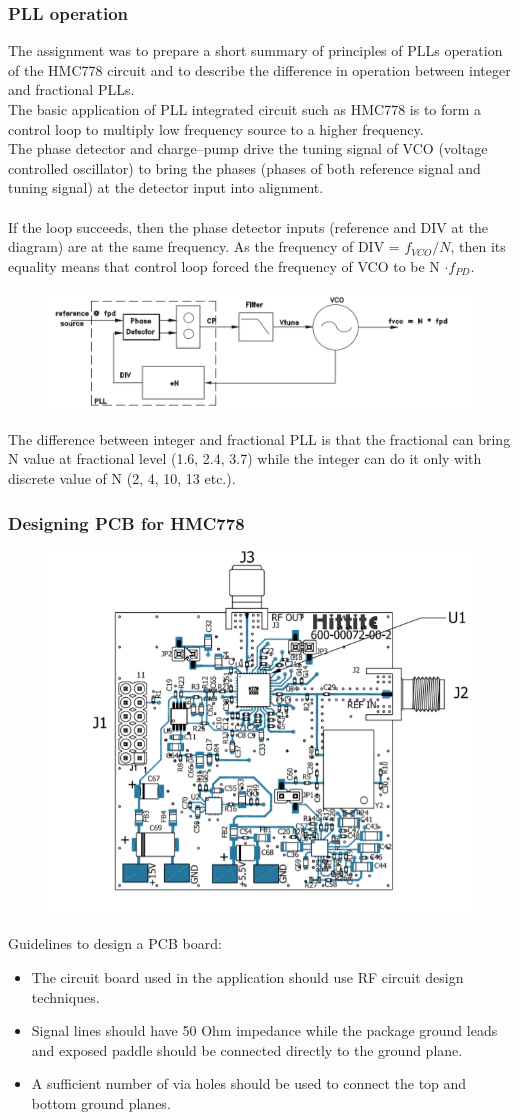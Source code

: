 \documentclass[a4paper, 11pt]{report}
\begin{document}
\subsubsection{PLL operation}
The assignment was to prepare a short summary of principles of PLLs operation of the HMC778 circuit and to describe the difference in operation between integer and fractional PLLs.
\\
The basic application of PLL integrated circuit such as HMC778 is to form a control loop to multiply low frequency source to a higher frequency.\\
The phase detector and charge--pump drive the tuning signal of VCO (voltage controlled oscillator) to bring the phases (phases of both reference signal and tuning signal) at the detector input into alignment.\\
\\If the loop succeeds, then the phase detector inputs (reference and DIV at the diagram) are at the same frequency. 
As the frequency of DIV = $f_{VCO} / N$, then its equality means that control loop forced the frequency of VCO to be N $\cdot f_{PD}$.
\begin{figure}[!h]
	\centering
	\includegraphics[width=0.7\linewidth]{pll3}
	\label{fig:pll3}
\end{figure}
The difference between integer and fractional PLL is that the fractional can bring N value at fractional level (1.6, 2.4, 3.7) while the integer can do it only with discrete value of N (2, 4, 10, 13 etc.).
\newpage
\subsubsection{Designing PCB for HMC778}
\begin{figure}[!h]
	\centering
	\includegraphics[width=0.3\linewidth]{pll2}
	\label{fig:pll2}
\end{figure}
Guidelines to design a PCB board:
\begin{itemize}
	\item The circuit board used in the application should use RF circuit design techniques. 
	\item Signal lines should have
	50 Ohm impedance while the package ground leads and exposed paddle should be connected directly
	to the ground plane. 
	\item A sufficient number of via holes should be used to connect the
	top and bottom ground planes.
\end{itemize}
\end{document}
